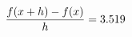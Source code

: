 \documentclass[preview]{standalone}
\begin{document}
\begin{align*}
\special{dvisvgm:raw <g id='unique000'>}\frac{f(x+h)-f(x)}{h} = 3.519\special{dvisvgm:raw </g>}
\end{align*}
\end{document}
